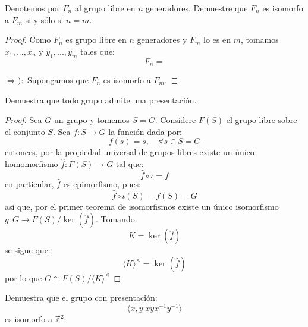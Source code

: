 \documentclass[12pt]{report}
\newcounter{it}
\theoremstyle{largebreak}
\newcommand\cf[3]{\ensuremath{#1:#2\rightarrow#3}}
\newcommand{\gen}[1]{\ensuremath{\langle#1\rangle}}
\begin{document}
    \begin{excer}
        Denotemos por $F_n$ al grupo libre en $n$ generadores. Demuestre que $F_n$ es isomorfo a $F_m$ si y sólo si $n=m$.
    \end{excer}

    \begin{proof}
        Como $F_n$ es grupo libre en $n$ generadores y $F_m$ lo es en $m$, tomamos $x_1,...,x_n$ y $y_1,...,y_m$ tales que:
        \begin{equation*}
            F_n=
        \end{equation*}

        $\Rightarrow):$ Supongamos que $F_n$ es isomorfo a $F_m$.
    \end{proof}

    \begin{excer}
        Demuestra que todo grupo admite una presentación.
    \end{excer}

    \begin{proof}
        Sea $G$ un grupo y tomemos $S=G$. Considere $F(S)$ el grupo libre sobre el conjunto $S$. Sea $\cf{f}{S}{G}$ la función dada por:
        \begin{equation*}
            f(s)=s,\quad\forall s\in S=G
        \end{equation*}
        entonces, por la propiedad universal de grupos libres existe un único homomorfismo $\cf{\hat{f}}{F(S)}{G}$ tal que:
        \begin{equation*}
            \hat{f}\circ\iota=f
        \end{equation*}
        en particular, $\hat{f}$ es epimorfismo, pues:
        \begin{equation*}
            \hat{f}\circ\iota(S)=f(S)=G
        \end{equation*}
        así que, por el primer teorema de isomorfismos existe un único isomorfismo $\cf{g}{G}{F(S)/\ker(\hat{f})}$. Tomando:
        \begin{equation*}
            K=\ker(\hat{f})
        \end{equation*}
        se sigue que:
        \begin{equation*}
            \gen{K}^\vartriangleleft=\ker(\hat{f})
        \end{equation*}
        por lo que $G\cong F(S)/\gen{K}^\vartriangleleft$
    \end{proof}

    \begin{excer}
        Demuestra que el grupo con presentación:
        \begin{equation*}
            \gen{x,y|xyx^{-1}y^{-1}}
        \end{equation*}
        es isomorfo a $\mathbb{Z}^2$.
    \end{excer}
\end{document}
